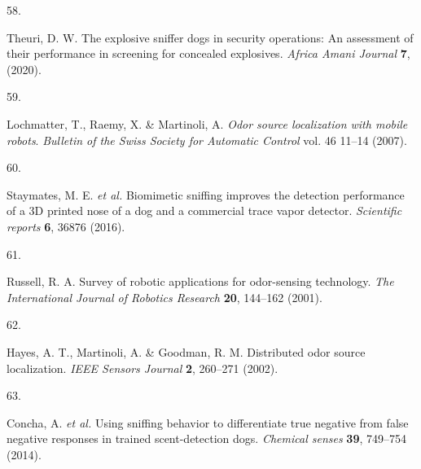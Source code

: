 \documentclass[
]{article}
\newlength{\cslhangindent}
\newlength{\csllabelwidth}
\newlength{\cslentryspacingunit} %
\newenvironment{CSLReferences}[2] %
 {%
  \setlength{\parindent}{0pt}
  \ifodd #1
  \let\oldpar\par
  \def\par{\hangindent=\cslhangindent\oldpar}
  \fi
  \setlength{\parskip}{#2\cslentryspacingunit}
 }%
 {}
\newcommand{\CSLLeftMargin}[1]{\parbox[t]{\csllabelwidth}{#1}}
\newcommand{\CSLRightInline}[1]{\parbox[t]{\linewidth - \csllabelwidth}{#1}\break}
\begin{document}
\begin{CSLReferences}{0}{0}
\leavevmode{}%
\CSLLeftMargin{58. }%
\CSLRightInline{Theuri, D. W. The explosive sniffer dogs in security operations: An assessment of their performance in screening for concealed explosives. \emph{Africa Amani Journal} \textbf{7}, (2020).}

\leavevmode{}%
\CSLLeftMargin{59. }%
\CSLRightInline{Lochmatter, T., Raemy, X. \& Martinoli, A. \emph{Odor source localization with mobile robots}. \emph{Bulletin of the Swiss Society for Automatic Control} vol. 46 11--14 (2007).}

\leavevmode{}%
\CSLLeftMargin{60. }%
\CSLRightInline{Staymates, M. E. \emph{et al.} Biomimetic sniffing improves the detection performance of a 3D printed nose of a dog and a commercial trace vapor detector. \emph{Scientific reports} \textbf{6}, 36876 (2016).}

\leavevmode{}%
\CSLLeftMargin{61. }%
\CSLRightInline{Russell, R. A. Survey of robotic applications for odor-sensing technology. \emph{The International Journal of Robotics Research} \textbf{20}, 144--162 (2001).}

\leavevmode{}%
\CSLLeftMargin{62. }%
\CSLRightInline{Hayes, A. T., Martinoli, A. \& Goodman, R. M. Distributed odor source localization. \emph{IEEE Sensors Journal} \textbf{2}, 260--271 (2002).}

\leavevmode{}%
\CSLLeftMargin{63. }%
\CSLRightInline{Concha, A. \emph{et al.} Using sniffing behavior to differentiate true negative from false negative responses in trained scent-detection dogs. \emph{Chemical senses} \textbf{39}, 749--754 (2014).}

\end{CSLReferences}
\end{document}
